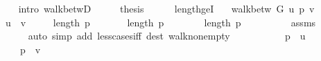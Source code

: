 \begin{isabellebody}
\ \ \ \ \isamarkupfalse%
\ {\isacharparenleft}{\kern0pt}intro\ walk{\isacharunderscore}{\kern0pt}betwD{\isacharparenleft}{\kern0pt}{}{\isacharparenright}{\kern0pt}{\isacharparenright}{\kern0pt}\isanewline
\ \ \isamarkupfalse%
\ \isamarkupfalse%
\ {\isacharquery}{\kern0pt}thesis\isanewline
\ \ \ \ \isacommand{{\isachardot}{\kern0pt}}\isamarkupfalse%
\isanewline
{}\isamarkupfalse%
%
\endisatagproof
{\isafoldproof}%
%
\isadelimproof
\isanewline
%
\endisadelimproof
%
\isadeliminvisible
\isanewline
%
\endisadeliminvisible
%
\isataginvisible
{}\isamarkupfalse%
\ length{\isacharunderscore}{\kern0pt}ge{\isacharunderscore}{\kern0pt}{}I{\isacharcolon}{\kern0pt}\isanewline
\ \ \ {\isachardoublequoteopen}walk{\isacharunderscore}{\kern0pt}betw\ G\ u\ p\ v{\isachardoublequoteclose}\isanewline
\ \ \ {\isachardoublequoteopen}u\ {\isasymnoteq}\ v{\isachardoublequoteclose}\isanewline
\ \ \ {\isachardoublequoteopen}{}\ {\isasymle}\ length\ p{\isachardoublequoteclose}%
\endisataginvisible
{\isafoldinvisible}%
%
\isadeliminvisible
\isanewline
%
\endisadeliminvisible
%
\isadelimproof
%
\endisadelimproof
%
\isatagproof
{}\isamarkupfalse%
\ {\isacharminus}{\kern0pt}\isanewline
\ \ \isacommand{{\isacharbraceleft}{\kern0pt}}\isamarkupfalse%
\ \isamarkupfalse%
\ {\isachardoublequoteopen}length\ p\ {\isacharless}{\kern0pt}\ {}{\isachardoublequoteclose}\isanewline
\ \ \ \ \isamarkupfalse%
\ {\isachardoublequoteopen}length\ p\ {\isacharequal}{\kern0pt}\ {}{\isachardoublequoteclose}\isanewline
\ \ \ \ \ \ \isamarkupfalse%
\ assms{\isacharparenleft}{\kern0pt}{}{\isacharparenright}{\kern0pt}\isanewline
\ \ \ \ \ \ \isamarkupfalse%
\ {\isacharparenleft}{\kern0pt}auto\ simp\ add{\isacharcolon}{\kern0pt}\ less{\isacharunderscore}{\kern0pt}{}{\isacharunderscore}{\kern0pt}cases{\isacharunderscore}{\kern0pt}iff\ dest{\isacharcolon}{\kern0pt}\ walk{\isacharunderscore}{\kern0pt}nonempty{\isacharparenright}{\kern0pt}\isanewline
\ \ \ \ \isamarkupfalse%
\isanewline
\ \ \ \ \ \ {\isachardoublequoteopen}p\ {\isacharequal}{\kern0pt}\ {\isacharbrackleft}{\kern0pt}u{\isacharbrackright}{\kern0pt}{\isachardoublequoteclose}\isanewline
\ \ \ \ \ \ {\isachardoublequoteopen}p\ {\isacharequal}{\kern0pt}\ {\isacharbrackleft}{\kern0pt}v{\isacharbrackright}{\kern0pt}{\isachardoublequoteclose}\isanewline

\end{isabellebody}
